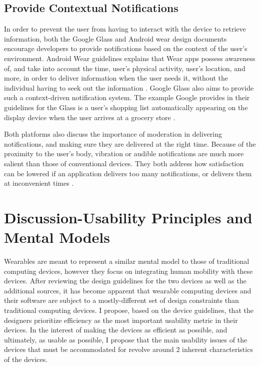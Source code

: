 \documentclass[12pt]{article}
\begin{document}
\subsection{Provide Contextual Notifications}
In order to prevent the user from having to interact with the device to retrieve information, both the Google Glass and Android wear design documents encourage developers to provide notifications based on the context of the user's environment. Android Wear guidelines explains that Wear apps possess awareness of, and take into account the time, user's physical activity, user's location, and more, in order to deliver information when the user needs it, without the individual having to seek out the information \cite{andr2}. Google Glass also aims to provide such a context-driven notification system. The example Google provides in their guidelines for the Glass is a user's shopping list automatically appearing on the display device when the user arrives at a grocery store \cite{goog}.

Both platforms also discuss the importance of moderation in delivering notifications, and making sure they are delivered at the right time. Because of the proximity to the user's body, vibration or audible notifications are much more salient than those of conventional devices. They both address how satisfaction can be lowered if an application delivers too many notifications, or delivers them at inconvenient times \cite{goog} \cite{andr}.

\section{Discussion-Usability Principles and Mental Models}
Wearables are meant to represent a similar mental model to those of traditional computing devices, however they focus on integrating human mobility with these devices. After reviewing the design guidelines for the two devices as well as the additional sources, it has become apparent that wearable computing devices and their software are subject to a mostly-different set of design constraints than traditional computing devices. I propose, based on the device guidelines, that the designers prioritize efficiency as the most important usability metric in their devices. In the interest of making the devices as efficient as possible, and ultimately, as usable as possible, I propose that the main usability issues of the devices that must be accommodated for revolve around 2 inherent characteristics of the devices.
\end{document}
